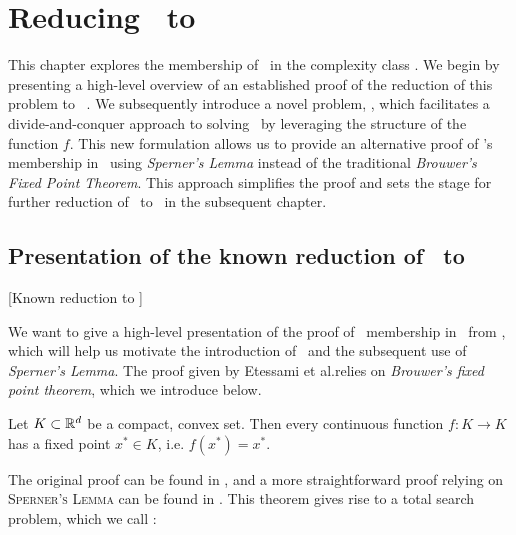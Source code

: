 \setchapterpreamble[u]{\margintoc}
\chapter{Reducing \Tarski\ to \PPAD}
\label{ch:ppad_reduction}

This chapter explores the membership of \Tarski\ in the complexity class \PPAD. We begin by presenting a high-level overview of an established proof of the reduction of this problem to \Brouwer~\cite{etessami_tarskis_2020}. We subsequently introduce a novel problem, \Tarskistar, which facilitates a divide-and-conquer approach to solving \Tarski\ by leveraging the structure of the function $f$. This new formulation allows us to provide an alternative proof of \Tarski's membership in \PPAD\ using \textit{Sperner's Lemma} instead of the traditional \textit{Brouwer's Fixed Point Theorem}. This approach simplifies the proof and sets the stage for further reduction of \Tarskistar\ to \EOPL\ in the subsequent chapter.

\section{Presentation of the known reduction of \Tarski\ to \PPAD}[Known reduction to \PPAD]

We want to give a high-level presentation of the proof of \Tarski\ membership in \PPAD\ from , which will help us motivate the introduction of \Tarskistar\ and the subsequent use of \textit{Sperner's Lemma}. The proof given by Etessami et al.\@ relies on \textit{Brouwer's fixed point theorem}, which we introduce below.

\begin{theorem}
	Let $K \subset \mathbb{R}^d$ be a compact, convex set. Then every continuous function $f : K \rightarrow K$ has a fixed point $x^*  \in K$, i.e. $f(x^*) = x^*$.
\end{theorem}

The original proof can be found in , and a more straightforward proof relying on \textsc{Sperner's Lemma} can be found in . This theorem gives rise to a total search problem, which we call \Brouwer:


